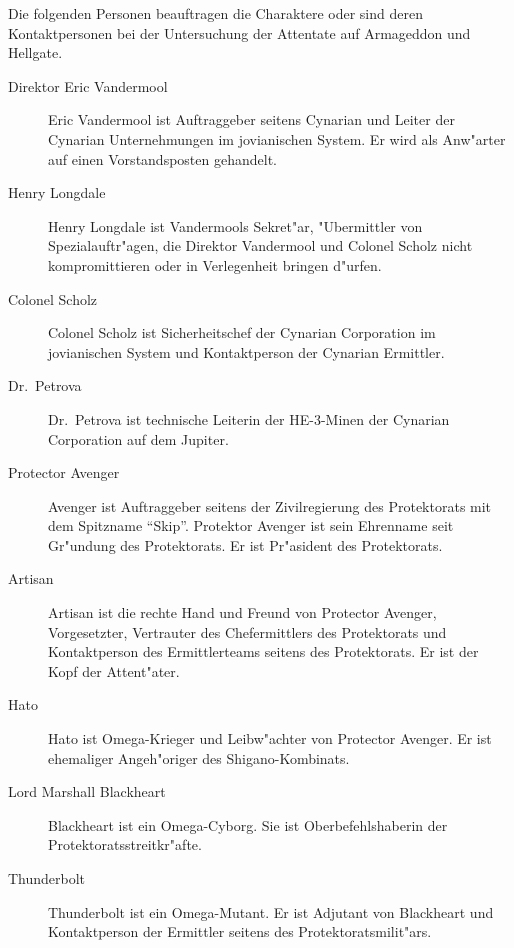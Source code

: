 
Die folgenden Personen beauftragen die Charaktere oder sind deren Kontaktpersonen bei der Untersuchung der Attentate auf Armageddon und Hellgate.


\begin{description}
    \item [Direktor Eric Vandermool] Eric Vandermool ist Auftraggeber seitens Cynarian und Leiter der Cynarian Unternehmungen im 
        jovianischen System. Er wird als Anw"arter auf einen Vorstandsposten gehandelt.
    \item [Henry Longdale] Henry  Longdale ist Vandermools Sekret"ar, "Ubermittler von Spezialauftr"agen, die Direktor Vandermool und 
        Colonel Scholz nicht kompromittieren oder in Verlegenheit bringen d"urfen.
    \item [Colonel Scholz] Colonel Scholz ist Sicherheitschef der Cynarian Corporation im jovianischen System und Kontaktperson der 
        Cynarian Ermittler.
    \item [Dr.~Petrova] Dr.~Petrova ist technische Leiterin der HE-3-Minen der Cynarian Corporation auf dem Jupiter.
\end{description}


\begin{description}
    \item [Protector Avenger] Avenger ist Auftraggeber seitens der Zivilregierung des Protektorats mit dem Spitzname ``Skip''. Protektor 
        Avenger ist sein Ehrenname seit Gr"undung des Protektorats. Er ist Pr"asident des Protektorats.
    \item [Artisan] Artisan ist die rechte Hand und Freund von Protector Avenger, Vorgesetzter, Vertrauter des Chefermittlers des 
        Protektorats und Kontaktperson des Ermittlerteams seitens des Protektorats. Er ist der Kopf der Attent"ater. 
    \item [Hato] Hato ist Omega-Krieger und Leibw"achter von Protector Avenger. Er ist ehemaliger Angeh"origer des Shigano-Kombinats.
    \item [Lord Marshall Blackheart] Blackheart ist ein Omega-Cyborg. Sie ist Oberbefehlshaberin der Protektoratsstreitkr"afte.
    \item [Thunderbolt] Thunderbolt ist ein Omega-Mutant. Er ist Adjutant von Blackheart und Kontaktperson der Ermittler seitens des 
        Protektoratsmilit"ars.
\end{description}
